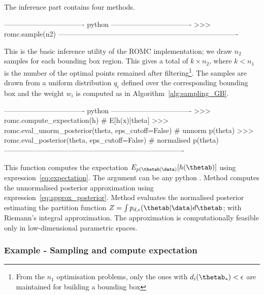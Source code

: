 The inference part contains four methods.

\begin{Code}
---------------------------------- python ----------------------------------
>>> romc.sample(n2)
----------------------------------------------------------------------------
\end{Code}

\noindent
This is the basic inference utility of the ROMC implementation; we
draw $n_2$ samples for each bounding box region. This gives a total of
$k \times n_2$, where $k < n_1$ is the number of the optimal points
remained after filtering\footnote{From the $n_1$ optimisation
  problems, only the ones with $d_i(\thetab_*) < \epsilon$ are
  maintained for building a bounding box}. The samples are drawn from
a uniform distribution $q_i$ defined over the corresponding bounding
box and the weight $w_i$ is computed as in
Algorithm~\ref{alg:sampling_GB}.

\begin{Code}
---------------------------------- python ----------------------------------
>>> romc.compute_expectation(h) # E[h(x)|theta]
>>> romc.eval_unorm_posterior(theta, eps_cutoff=False) # unnorm p(theta)
>>> romc.eval_posterior(theta, eps_cutoff=False) # normalised p(theta)
----------------------------------------------------------------------------
\end{Code}

\noindent
This function computes the expectation
$E_{p(\thetab|\data)}[h(\thetab)]$ using
expression~\eqref{eq:expectation}. The argument  can be any
python . Method  computes the
unnormalised posterior approximation using
expression~\eqref{eq:approx_posterior}. Method 
evaluates the normalised posterior estimating the partition function
$Z = \int p_{d,\epsilon}(\thetab|\data)d\thetab$; with Riemann's
integral approximation. The approximation is computationally feasible
only in low-dimensional parametric spaces.

\subsubsection*{Example - Sampling and compute expectation}

